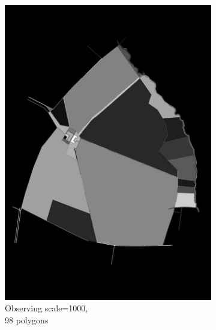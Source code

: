 \documentclass[12pt]{article}
\begin{document}
\begin{figure}[H]
\begin{subfigure}[b]{.3\textwidth}
		\includegraphics[width=1\linewidth]{images/polygon_recovery/felzenswalb2_scale1000_region240.png}  
	   	\caption{Observing scale=1000, \\ 98 polygons}
	\end{subfigure}
	\begin{subfigure}[b]{.3\textwidth}
		\centering

\end{subfigure}
\end{figure}
\end{document}
